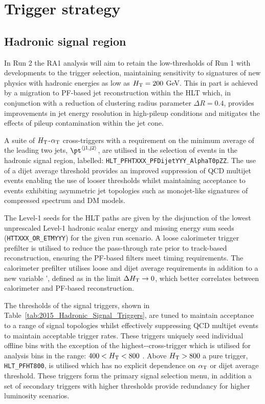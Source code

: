 \section{Trigger strategy}
\label{sec:triggers}


\subsection{Hadronic signal region\label{sec:hadronic_signal_region}}

In Run 2 the RA1 analysis will aim to retain the low-thresholds of Run 1 with developments 
to the trigger selection, maintaining sensitivity to signatures of new physics with hadronic 
energies as low as $\mbox{$H_\text{T}$} = 200$ GeV. This in part is achieved by a migration to PF-based 
jet reconstruction within the HLT which, in conjunction with a reduction of clustering radius 
parameter $\Delta R = 0.4$, provides improvements in jet energy resolution in high-pileup 
conditions and mitigates the effects of pileup contamination within the jet cone.

A suite of $\mbox{$H_\text{T}$}$-$\alpha_{\text{T}}$ cross-triggers with a requirement on the minimum average \pt of 
the leading two jets, $\pt^{\rm \left<j1,j2\right>}$, are utilised in the selection of events in 
the hadronic signal region, labelled: \verb!HLT_PFHTXXX_PFDijetYYY_AlphaT0pZZ!. The use of a 
dijet average threshold provides an improved suppression of QCD multijet events enabling the use 
of looser \alphat thresholds whilst maintaining acceptance to events exhibiting asymmetric jet 
topologies such as monojet-like signatures of compressed spectrum and DM models. 

The Level-1 seeds for the HLT paths are given by the disjunction of the lowest 
unprescaled Level-1 hadronic scalar energy and missing energy sum seeds (\verb!HTTXXX_OR_ETMYYY!) for 
the given run scenario. A loose calorimeter trigger prefilter is utilised to reduce the pass-through 
rate prior to track-based 
reconstruction, ensuring the PF-based filters meet timing requirements. The calorimeter prefilter 
utilises loose \scalht and dijet average \pt requirements in addition to a new variable \alphat', 
defined as \alphat in the limit $\Delta\mbox{$H_\text{T}$} \rightarrow 0$, which better correlates \alphat 
between calorimeter and PF-based reconstruction.

The thresholds of the signal triggers, shown in Table~\ref{tab:2015_Hadronic_Signal_Triggers}, are 
tuned to maintain acceptance to a range of signal topologies whilst effectively suppressing QCD 
multijet events to maintain acceptable trigger rates. These triggers uniquely seed individual offline \scalht 
bins with the exception of the highest-\scalht \scalht-\alphat cross-trigger which is utilised for analysis 
bins in the range: 
$400 < \mbox{$H_\text{T}$} < 800$ \GeV. Above $\mbox{$H_\text{T}$} > 800$ a pure \scalht trigger, \verb!HLT_PFHT800!, is utilised 
which has no explicit dependence on $\alpha_{\text{T}}$ or dijet average threshold. These triggers form the primary 
signal selection menu, in addition a set of secondary triggers with higher \alphat thresholds provide redundancy 
for higher luminosity scenarios. 

